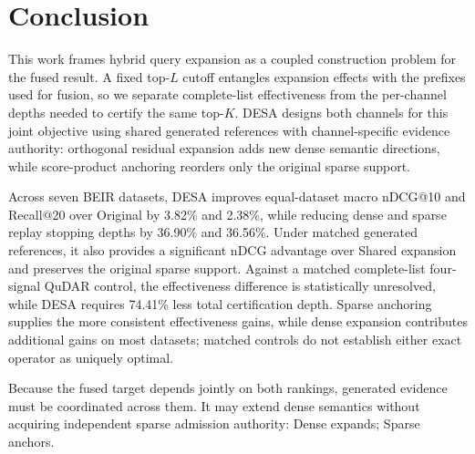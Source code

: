 \section{Conclusion}

\label{sec:conclusion}

This work frames hybrid query expansion as a coupled construction problem for the fused result. A fixed top-\(L\) cutoff entangles expansion effects with the prefixes used for fusion, so we separate complete-list effectiveness from the per-channel depths needed to certify the same top-\(K\). DESA designs both channels for this joint objective using shared generated references with channel-specific evidence authority: orthogonal residual expansion adds new dense semantic directions, while score-product anchoring reorders only the original sparse support.

Across seven BEIR datasets, DESA improves equal-dataset macro nDCG@10 and Recall@20 over Original by 3.82\% and 2.38\%, while reducing dense and sparse replay stopping depths by 36.90\% and 36.56\%. Under matched generated references, it also provides a significant nDCG advantage over Shared expansion and preserves the original sparse support. Against a matched complete-list four-signal QuDAR control, the effectiveness difference is statistically unresolved, while DESA requires 74.41\% less total certification depth. Sparse anchoring supplies the more consistent effectiveness gains, while dense expansion contributes additional gains on most datasets; matched controls do not establish either exact operator as uniquely optimal.

Because the fused target depends jointly on both rankings, generated evidence must be coordinated across them. It may extend dense semantics without acquiring independent sparse admission authority: Dense expands; Sparse anchors.
